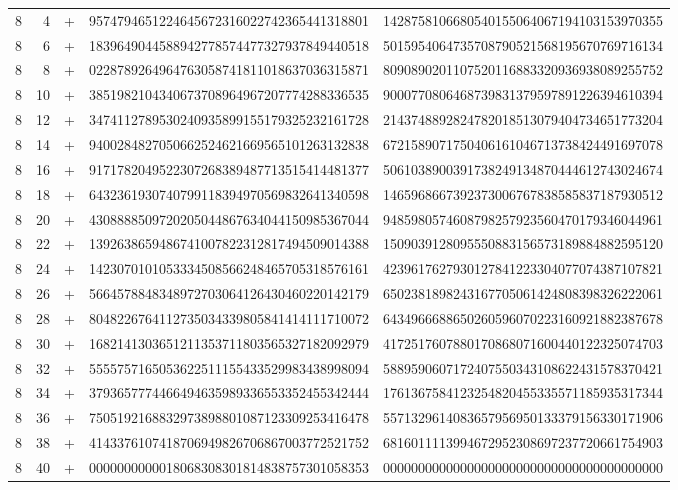 \begin{longtable}{rrrll}
8 & 4 & + & 9574794651224645672316022742365441318801 & 1428758106680540155064067194103153970355 \\
8 & 6 & + & 1839649044588942778574477327937849440518 & 5015954064735708790521568195670769716134 \\
8 & 8 & + & 0228789264964763058741811018637036315871 & 8090890201107520116883320936938089255752 \\
8 & 10 & + & 3851982104340673708964967207774288336535 & 9000770806468739831379597891226394610394 \\
8 & 12 & + & 3474112789530240935899155179325232161728 & 2143748892824782018513079404734651773204 \\
8 & 14 & + & 9400284827050662524621669565101263132838 & 6721589071750406161046713738424491697078 \\
8 & 16 & + & 9171782049522307268389487713515414481377 & 5061038900391738249134870444612743024674 \\
8 & 18 & + & 6432361930740799118394970569832641340598 & 1465968667392373006767838585837187930512 \\
8 & 20 & + & 4308888509720205044867634044150985367044 & 9485980574608798257923560470179346044961 \\
8 & 22 & + & 1392638659486741007822312817494509014388 & 1509039128095550883156573189884882595120 \\
8 & 24 & + & 1423070101053334508566248465705318576161 & 4239617627930127841223304077074387107821 \\
8 & 26 & + & 5664578848348972703064126430460220142179 & 6502381898243167705061424808398326222061 \\
8 & 28 & + & 8048226764112735034339805841414111710072 & 6434966688650260596070223160921882387678 \\
8 & 30 & + & 1682141303651211353711803565327182092979 & 4172517607880170868071600440122325074703 \\
8 & 32 & + & 5555757165053622511155433529983438998094 & 5889590607172407550343108622431578370421 \\
8 & 34 & + & 3793657774466494635989336553352455342444 & 1761367584123254820455335571185935317344 \\
8 & 36 & + & 7505192168832973898801087123309253416478 & 5571329614083657956950133379156330171906 \\
8 & 38 & + & 4143376107418706949826706867003772521752 & 6816011113994672952308697237720661754903 \\
8 & 40 & + & 0000000000018068308301814838757301058353 & 0000000000000000000000000000000000000000 \\

\end{longtable}
